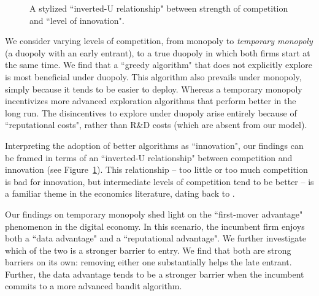 \documentclass[../competing_bandits.tex]{subfiles}
\begin{document}
\begin{figure}
\begin{center}
 \caption{A stylized ``inverted-U relationship" between strength of competition and ``level of innovation".}
\label{fig:inverted-U}
\end{center}
\end{figure}

We consider varying levels of competition, from monopoly to \emph{temporary monopoly} (a duopoly with an early entrant), to a true duopoly in which both firms start at the same time. We find that a ``greedy algorithm" that does not explicitly explore is most beneficial under duopoly. This algorithm also prevails under monopoly, simply because it tends to be easier to deploy. Whereas a temporary monopoly incentivizes more advanced exploration algorithms that perform better in the long run. The disincentives to explore under duopoly arise entirely because of ``reputational costs", rather than R\&D costs (which are absent from our model).

Interpreting the adoption of better algorithms as ``innovation", our findings can be framed in terms of an ``inverted-U relationship" between competition and innovation (see Figure~\ref{fig:inverted-U}). This relationship -- too little or too much competition is bad for innovation, but intermediate levels of competition tend to be better -- is a familiar theme in the economics literature, dating back to \cite{Schumpeter-42}.

Our findings on temporary monopoly shed light on the ``first-mover advantage" phenomenon in the digital economy. In this scenario, the incumbent firm enjoys both a ``data advantage" and a ``reputational advantage". We further investigate which of the two is a stronger barrier to entry. We find that both are strong barriers on its own: removing either one substantially helps the late entrant. Further, the data advantage tends to be a stronger barrier when the incumbent commits to a more advanced bandit algorithm.
\end{document}
